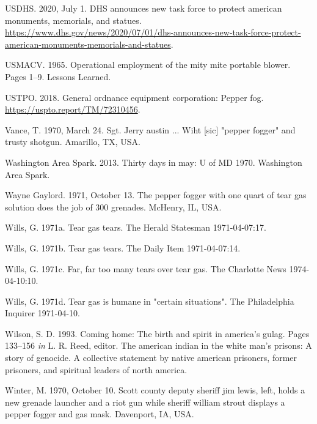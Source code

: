 \documentclass[
  11pt,
]{krantz}
\newlength{\cslhangindent}
\newlength{\cslentryspacingunit} %
\newenvironment{CSLReferences}[2] %
 {%
  \setlength{\parindent}{0pt}
  \ifodd #1
  \let\oldpar\par
  \def\par{\hangindent=\cslhangindent\oldpar}
  \fi
  \setlength{\parskip}{#2\cslentryspacingunit}
 }%
 {}
\begin{document}
\begin{CSLReferences}{1}{0}
\leavevmode{}%
USDHS. 2020, July 1. DHS announces new task force to protect american monuments, memorials, and statues. \url{https://www.dhs.gov/news/2020/07/01/dhs-announces-new-task-force-protect-american-monuments-memorials-and-statues}.

\leavevmode{}%
USMACV. 1965. Operational employment of the mity mite portable blower. Pages 1--9. Lessons Learned.

\leavevmode{}%
USTPO. 2018. General ordnance equipment corporation: Pepper fog. \url{https://uspto.report/TM/72310456}.

\leavevmode{}%
Vance, T. 1970, March 24. Sgt. Jerry austin ... Wiht {[}sic{]} "pepper fogger" and trusty shotgun. Amarillo, TX, USA.

\leavevmode{}%
Washington Area Spark. 2013. Thirty days in may: U of MD 1970. {Washington Area Spark}.

\leavevmode{}%
Wayne Gaylord. 1971, October 13. The pepper fogger with one quart of tear gas solution does the job of 300 grenades. McHenry, IL, USA.

\leavevmode{}%
Wills, G. 1971a. Tear gas tears. The Herald Statesman 1971-04-07:17.

\leavevmode{}%
Wills, G. 1971b. Tear gas tears. The Daily Item 1971-04-07:14.

\leavevmode{}%
Wills, G. 1971c. Far, far too many tears over tear gas. The Charlotte News 1974-04-10:10.

\leavevmode{}%
Wills, G. 1971d. Tear gas is humane in "certain situations". The Philadelphia Inquirer 1971-04-10.

\leavevmode{}%
Wilson, S. D. 1993. Coming home: The birth and spirit in america's gulag. Pages 133--156 \emph{in} L. R. Reed, editor. The american indian in the white man's prisons: A story of genocide. A collective statement by native american prisoners, former prisoners, and spiritual leaders of north america.

\leavevmode{}%
Winter, M. 1970, October 10. Scott county deputy sheriff jim lewis, left, holds a new grenade launcher and a riot gun while sheriff william strout displays a pepper fogger and gas mask. Davenport, IA, USA.


\end{CSLReferences}
\end{document}
